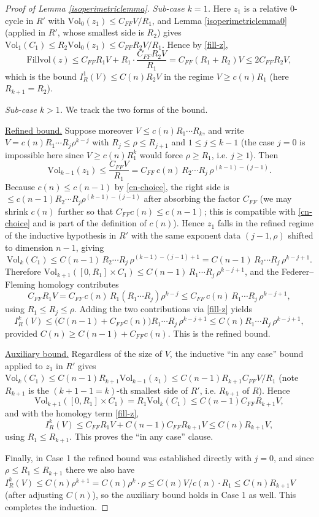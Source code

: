 \documentclass{amsart}
\newtheorem*{theorem 1}{Theorem 1}
\newtheorem*{theorem 2}{Theorem 2}
\newtheorem*{theorem 3}{Theorem 3}
\numberwithin{equation}{section}
\newcommand{\Vol}{\textrm{Vol}}
\begin{document}
\begin{proof} [Proof of Lemma \ref{isoperimetriclemma}]
\emph{Sub-case $k=1$.}  Here $z_1$ is a relative $0$-cycle in
$R'$ with $\Vol_0(z_1) \le C_{FF} V / R_1$, and
Lemma \ref{isoperimetriclemma0} (applied in $R'$, whose smallest
side is $R_2$) gives $\Vol_1(C_1) \le R_2 \Vol_0(z_1) \le
C_{FF} R_2 V / R_1$.  Hence by \eqref{fill-z},
$$ \mathrm{Fillvol}(z) \le C_{FF} R_1 V + R_1 \cdot
   \frac{C_{FF} R_2 V}{R_1} = C_{FF}(R_1 + R_2) V \le 2 C_{FF} R_2 V, $$
which is the bound $I_R^1(V) \le C(n) R_2 V$ in the regime
$V \ge c(n) R_1$ (here $R_{k+1}=R_2$).

\emph{Sub-case $k>1$.}  We track the two forms of the bound.

\underline{Refined bound.}  Suppose moreover $V \le c(n) R_1\cdots
R_k$, and write $V = c(n) R_1 \cdots R_j \rho^{k-j}$ with $R_j \le
\rho \le R_{j+1}$ and $1 \le j \le k-1$ (the case $j=0$ is
impossible here since $V \ge c(n) R_1^k$ would force $\rho \ge
R_1$, i.e. $j\ge 1$).  Then
$$ \Vol_{k-1}(z_1) \le \frac{C_{FF} V}{R_1}
   = C_{FF}\, c(n)\, R_2 \cdots R_j\, \rho^{(k-1)-(j-1)}. $$
Because $c(n) \le c(n-1)$ by \eqref{cn-choice}, the right side is
$\le c(n-1) R_2 \cdots R_j \rho^{(k-1)-(j-1)}$ after absorbing the
factor $C_{FF}$ (we may shrink $c(n)$ further so that
$C_{FF} c(n) \le c(n-1)$; this is compatible with \eqref{cn-choice}
and is part of the definition of $c(n)$).  Hence $z_1$ falls in the
refined regime of the inductive hypothesis in $R'$ with the same
exponent data $(j-1,\rho)$ shifted to dimension $n-1$, giving
$$ \Vol_k(C_1) \le C(n-1)\, R_2 \cdots R_j\, \rho^{(k-1)-(j-1)+1}
   = C(n-1)\, R_2 \cdots R_j\, \rho^{k-j+1}. $$
Therefore $\Vol_{k+1}([0,R_1]\times C_1) \le C(n-1)\, R_1 \cdots
R_j\, \rho^{k-j+1}$, and the Federer--Fleming homology contributes
$$ C_{FF} R_1 V = C_{FF}\, c(n)\, R_1 (R_1 \cdots R_j)\rho^{k-j}
   \le C_{FF}\, c(n)\, R_1 \cdots R_j\, \rho^{k-j+1}, $$
using $R_1 \le R_j \le \rho$.  Adding the two contributions via
\eqref{fill-z} yields
$$ I_R^k(V) \le \big(C(n-1) + C_{FF} c(n)\big) R_1 \cdots R_j\,
   \rho^{k-j+1} \le C(n) R_1 \cdots R_j\, \rho^{k-j+1}, $$
provided $C(n) \ge C(n-1) + C_{FF} c(n)$.  This is the refined
bound.

\underline{Auxiliary bound.}  Regardless of the size of $V$, the
inductive ``in any case'' bound applied to $z_1$ in $R'$ gives
$\Vol_k(C_1) \le C(n-1) R_{k+1} \Vol_{k-1}(z_1) \le C(n-1) R_{k+1}
C_{FF} V / R_1$ (note $R_{k+1}$ is the $(k+1-1=k)$-th smallest side
of $R'$, i.e. $R_{k+1}$ of $R$).  Hence
$$ \Vol_{k+1}([0,R_1]\times C_1) = R_1 \Vol_k(C_1)
   \le C(n-1) C_{FF} R_{k+1} V, $$
and with the homology term \eqref{fill-z},
$$ I_R^k(V) \le C_{FF} R_1 V + C(n-1) C_{FF} R_{k+1} V
   \le C(n) R_{k+1} V, $$
using $R_1 \le R_{k+1}$.  This proves the ``in any case'' clause.

\medskip
Finally, in Case 1 the refined bound was established directly with
$j=0$, and since $\rho \le R_1 \le R_{k+1}$ there we also have
$I_R^k(V) \le C(n)\rho^{k+1} = C(n) \rho^k \cdot \rho \le C(n) V /
c(n) \cdot R_1 \le C(n) R_{k+1} V$ (after adjusting $C(n)$), so the
auxiliary bound holds in Case 1 as well.  This completes the
induction.
\end{proof}
\end{document}
